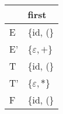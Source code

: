 \documentclass{standalone}
\providecommand\lightrule{%
	\arrayrulecolor{black!30}%
	\midrule[\lightrulewidth]%
	\arrayrulecolor{black}}
\begin{document}
\begin{tabularx}{\textwidth}{XX}
    & first \\
    \midrule
        E
        &
        \{id, (\}
        \\ \lightrule
        E'
        &
        \{\(\varepsilon, +\)\}
        \\ \lightrule
        T
        &
        \{id, (\}
        \\ \lightrule
        T'
        &
        \{\(\varepsilon, *\)\}
        \\ \lightrule
        F
        &
        \{id, (\}
\end{tabularx}
\end{document}
